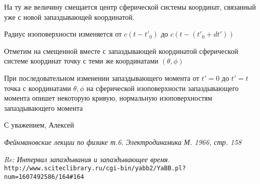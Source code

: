 \documentclass{article}
\begin{document}
На ту же величину смещается центр сферической системы координат, связанный уже с новой запаздывающей координатой.

Радиус изоповерхности изменяется от $c(t-t'_{0})$ до $c(t-(t'_{0} + d t'))$

Отметим на смещенной вместе с запаздывающей координатой сферической системе координат точку с теми же координатами $(\theta, \phi)$

При последовательном изменении запаздывающего момента от $t'=0$ до $t'=t$ точка с координатами $\theta, \phi$ на сферической изоповерхности запаздывающего момента опишет некоторую кривую, нормальную изоповерхностям запаздывающего момента



С уважением, Алексей

\begin{thebibliography}{99}



\textit{Фейнмановские лекции по физике т.6. Электродинамика М. 1966, стр. 158}

\textit{Re: Интервал запаздывания и запаздывающее время.}
\\\texttt{http://www.sciteclibrary.ru/cgi-bin/yabb2/YaBB.pl?num=1607492586/164\#164}








\end{thebibliography}
\end{document}
